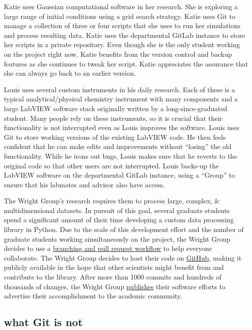 \documentclass{training}
\begin{document}
Katie uses Gaussian computational software in her research.
She is exploring a large range of initial conditions using a grid search strategy.
Katie uses Git to manage a collection of three or four scripts that she uses to run her simulations  and process resulting data.
Katie uses the departmental GitLab instance to store her scripts in a private repository.
Even though she is the only student working on the project right now, Katie benefits from the version control and backup features as she continues to tweak her script.
Katie appreciates the assurance that she can always go back to an earlier version.

Louis uses several custom instruments in his daily research.
Each of these is a typical analytical/physical chemistry instrument with many components and a large LabVIEW software stack originally written by a long-since-graduated student.
Many people rely on these instruments, so it is crucial that their functionality is not interrupted even as Louis improves the software.
Louis uses Git to store working versions of the existing LabVIEW code.
He then feels confident that he can make edits and improvements without ``losing'' the old functionality.
While he irons out bugs, Louis makes sure that he reverts to the original code so that other users are not interrupted.
Louis backs-up the LabVIEW software on the departmental GitLab instance, using a ``Group'' to ensure that his labmates and advisor also have access.

The Wright Group's research requires them to process large, complex, \& multidimensional datasets.
In pursuit of this goal, several graduate students spend a significant amount of their time developing a custom data processing library in Python.
Due to the scale of this development effort and the number of graduate students working simultaneously on the project, the Wright Group decides to use a \href{https://nvie.com/posts/a-successful-git-branching-model/}{branching and pull request workflow} to help everyone collaborate.
The Wright Group decides to host their code on \href{https://github.com/wright-group}{GitHub}, making it publicly available in the hope that other scientists might benefit from and contribute to the library.
After more than 1000 commits and hundreds of thousands of changes, the Wright Group \href{https://doi.org/10.21105/joss.01141}{publishes} their software efforts to advertise their accomplishment to the academic community.

\subsection{what Git is not}
\end{document}
